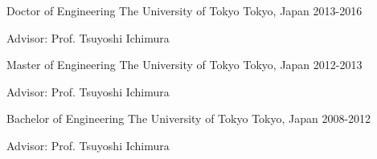 

\begin{cventries}

  \cventry
    {Doctor of Engineering} %
    {The University of Tokyo} %
    {Tokyo, Japan} %
    {2013-2016} %
    {
      \begin{cvitems} %
        \item {Advisor: Prof. Tsuyoshi Ichimura}
      \end{cvitems}
    }

  \cventry
    {Master of Engineering} %
    {The University of Tokyo} %
    {Tokyo, Japan} %
    {2012-2013} %
    {
      \begin{cvitems} %
        \item {Advisor: Prof. Tsuyoshi Ichimura}
      \end{cvitems}
    }

  \cventry
    {Bachelor of Engineering} %
    {The University of Tokyo} %
    {Tokyo, Japan} %
    {2008-2012} %
    {
      \begin{cvitems} %
        \item {Advisor: Prof. Tsuyoshi Ichimura}
      \end{cvitems}
    }

\end{cventries}
